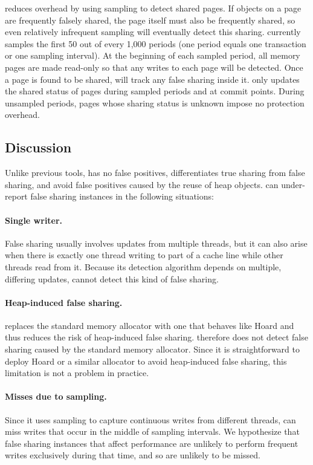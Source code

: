 \sheriffdetect{} reduces overhead by using sampling to detect shared
pages. If objects on a page are frequently falsely shared, the page
itself must also be frequently shared, so even relatively infrequent
sampling will eventually detect this sharing.  \sheriffdetect{}
currently samples the first 50 out of every 1,000 periods (one period
equals one transaction or one sampling interval). At the beginning of
each sampled period, all memory pages are made read-only so that any
writes to each page will be detected.  Once a page is found to be
shared, \sheriffdetect{} will track any false sharing inside it.
\sheriffdetect{} only updates the shared status of pages during
sampled periods and at commit points. During unsampled periods, pages
whose sharing status is unknown impose no protection overhead.

\subsection{Discussion}

Unlike previous tools, \sheriffdetect{} has no false positives, differentiates true sharing from
false sharing, and avoid false positives caused by the reuse of heap objects.
\sheriffdetect{} can under-report false sharing instances in the following situations:

\paragraph{Single writer.}
False sharing usually involves updates from multiple threads, but it
can also arise when there is exactly one thread writing to part of a
cache line while other threads read from it. Because its detection
algorithm depends on multiple, differing updates, \sheriffdetect{} cannot
detect this kind of false sharing.

\paragraph{Heap-induced false sharing.}  \sheriff{} replaces the standard
memory allocator with one that behaves like Hoard and thus reduces the
risk of heap-induced false sharing. \sheriffdetect{} therefore does
not detect false sharing caused by the standard memory allocator.
Since it is straightforward to deploy Hoard or a similar allocator
to avoid heap-induced false sharing, this limitation is not a problem
in practice.


\paragraph{Misses due to sampling.}  Since it uses sampling to
  capture continuous writes from different threads, \sheriffdetect{} can
  miss writes that occur in the middle of sampling intervals. We
  hypothesize that false sharing instances that affect performance are
  unlikely to perform frequent writes exclusively during that time, and so
  are unlikely to be missed.
